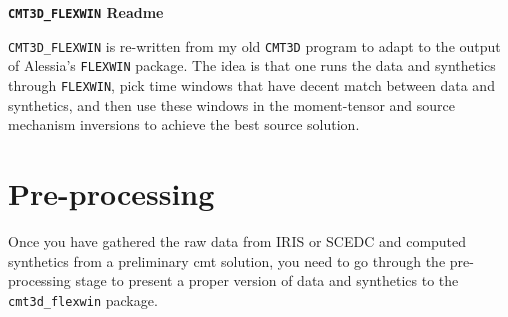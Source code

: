 \documentclass[12pt,titlepage,fleqn]{article}
\begin{document}
\begin{spacing}{1.0} %
\begin{center}

\Large {\vspace{0.1in} \bf \verb=CMT3D_FLEXWIN= Readme}
\end{center}

\end{spacing}

\verb=CMT3D_FLEXWIN= is re-written from my old \verb=CMT3D= program to adapt to the output of Alessia's \verb=FLEXWIN= package. The idea is that one runs the data and synthetics through \verb=FLEXWIN=, pick time windows that have decent match between data and synthetics, and then use these windows in the moment-tensor and source mechanism inversions to achieve the best source solution.

\section{Pre-processing}

Once you have gathered the raw data from IRIS or SCEDC and computed synthetics from a preliminary cmt solution, you need to go through the pre-processing stage to present a proper version of data and synthetics to the \verb=cmt3d_flexwin= package.
\end{document}
